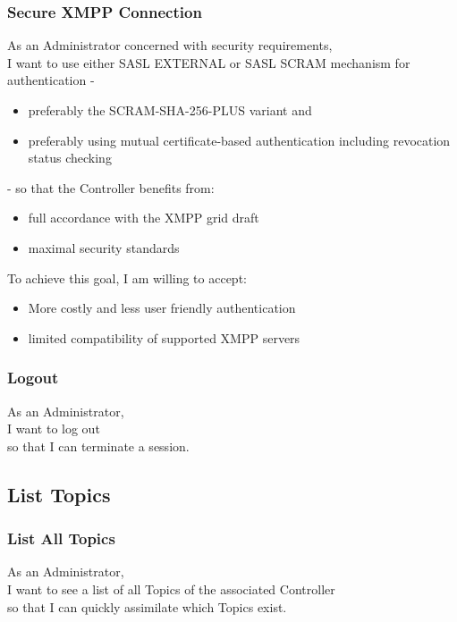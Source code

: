 \subsubsection{Secure XMPP Connection}
As an Administrator concerned with security requirements,\\
I want to use either SASL EXTERNAL or SASL SCRAM mechanism for authentication -

\begin{itemize}
    \item preferably the SCRAM-SHA-256-PLUS variant and
    \item preferably using mutual certificate-based authentication including revocation status checking
\end{itemize}

\noindent - so that the Controller benefits from:

\begin{itemize}
    \item full accordance with the XMPP grid draft~\cite{ietf-mile-xmpp-grid-05}
    \item maximal security standards
\end{itemize}

\noindent To achieve this goal, I am willing to accept:
\begin{itemize}
    \item More costly and less user friendly authentication
    \item limited compatibility of supported XMPP servers
\end{itemize}

\subsubsection{Logout}

As an Administrator,\\
I want to log out\\
so that I can terminate a session.

\subsection{List Topics}

\subsubsection{List All Topics}
As an Administrator,\\
I want to see a list of all Topics of the associated Controller\\
so that I can quickly assimilate which Topics exist.

